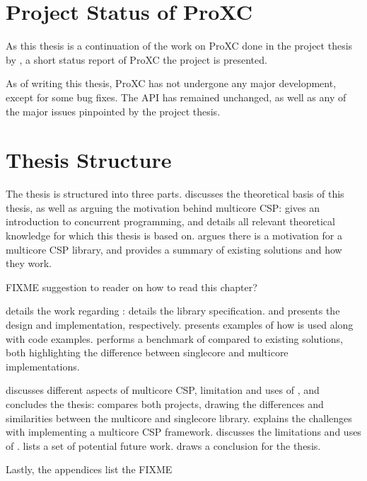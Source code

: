 \section{Project Status of ProXC}

As this thesis is a continuation of the work on ProXC done in the project thesis by \citet{pettersen2016proxc}, a short status report of ProXC the project is presented.

As of writing this thesis, ProXC has not undergone any major development, except for some bug fixes. The API has remained unchanged, as well as any of the major issues pinpointed by the project thesis. 


\section{Thesis Structure}


The thesis is structured into three parts.  discusses the theoretical basis of this thesis, as well as arguing the motivation behind multicore CSP:  gives an introduction to concurrent programming, and details all relevant theoretical knowledge for which this thesis is based on.  argues there is a motivation for a multicore CSP library, and provides a summary of existing solutions and how they work. 

FIXME suggestion to reader on how to read this chapter?

 details the work regarding \Proxc{}:  details the library specification.  and  presents the design and implementation, respectively.  presents examples of how \Proxc{} is used along with code examples.  performs a benchmark of \Proxc{} compared to existing solutions, both highlighting the difference between singlecore and multicore implementations.

 discusses different aspects of multicore CSP, limitation and uses of \Proxc{}, and concludes the thesis:  compares both projects, drawing the differences and similarities between the multicore and singlecore library.  explains the challenges with implementing a multicore CSP framework.  discusses the limitations and uses of \Proxc{}.  lists a set of potential future work.  draws a conclusion for the thesis.


Lastly, the appendices list the FIXME

